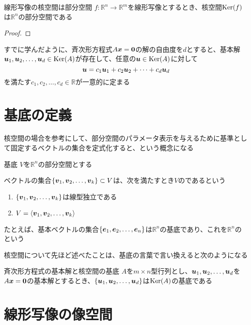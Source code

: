 \documentclass[../../../topic_linear-algebra]{subfiles}
\begin{document}
\begin{theorem}{線形写像の核空間は部分空間}
  $f\colon \mathbb{R}^n \to \mathbb{R}^m$を線形写像とするとき、核空間$\operatorname{Ker}(f)$は$\mathbb{R}^n$の部分空間である
\end{theorem}

\begin{proof}
\end{proof}

\sectionline

すでに学んだように、斉次形方程式$A\vb*{x} = \vb*{0}$の解の自由度を$d$とすると、基本解$\vb*{u}_1, \vb*{u}_2, \dots, \vb*{u}_d \in \operatorname{Ker}(A)$が存在して、任意の$\vb*{u} \in \operatorname{Ker}(A)$に対して
\begin{equation*}
  \vb*{u} = c_1 \vb*{u}_1 + c_2 \vb*{u}_2 + \cdots + c_d \vb*{u}_d
\end{equation*}
を満たす$c_1, c_2, \dots, c_d \in \mathbb{R}$が一意的に定まる

\br


\sectionline
\section{基底の定義}

核空間の場合を参考にして、部分空間のパラメータ表示を与えるために基準として固定するベクトルの集合を定式化すると、という概念になる

\begin{definition}{基底}
  $V$を$\mathbb{R}^n$の部分空間とする

  ベクトルの集合$\{ \vb*{v}_1, \vb*{v}_2, \dots, \vb*{v}_k \} \subset V$は、次を満たすとき$V$のであるという
  \begin{enumerate}[label=\romanlabel]
    \item $\{ \vb*{v}_1, \vb*{v}_2, \dots, \vb*{v}_k \}$は線型独立である
    \item $V = \langle \vb*{v}_1, \vb*{v}_2, \dots, \vb*{v}_k \rangle$
  \end{enumerate}
\end{definition}

たとえば、基本ベクトルの集合$\{ \vb*{e}_1, \vb*{e}_2, \dots, \vb*{e}_n \}$は$\mathbb{R}^n$の基底であり、これを$\mathbb{R}^n$のという

\sectionline

核空間について先ほど述べたことは、基底の言葉で言い換えると次のようになる

\begin{theorem}{斉次形方程式の基本解と核空間の基底}
  $A$を$m \times n$型行列とし、$\vb*{u}_1, \vb*{u}_2, \dots, \vb*{u}_d$を$A\vb*{x} = \vb*{0}$の基本解とするとき、$\{ \vb*{u}_1, \vb*{u}_2, \dots, \vb*{u}_d \}$は$\operatorname{Ker}(A)$の基底である
\end{theorem}

\sectionline
\section{線形写像の像空間}

\end{document}
